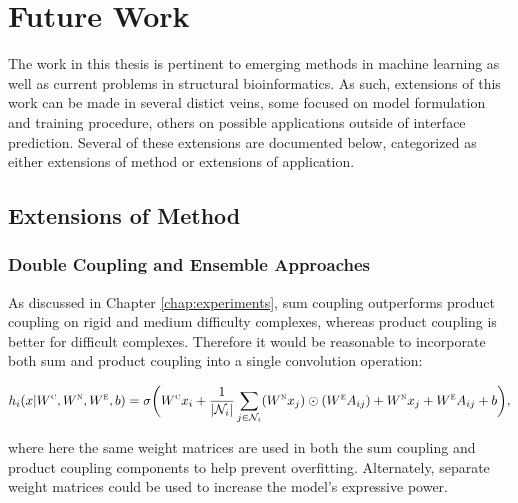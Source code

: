 \chapter{Future Work}
\label{chap:future}

The work in this thesis is pertinent to emerging methods in machine learning as well as current problems in structural bioinformatics.
As such, extensions of this work can be made in several distict veins, some focused on model formulation and training procedure, others on possible applications outside of interface prediction.
Several of these extensions are documented below, categorized as either extensions of method or extensions of application.

\section{Extensions of Method}

\subsection{Double Coupling and Ensemble Approaches}

As discussed in Chapter \ref{chap:experiments}, sum coupling outperforms product coupling on rigid and medium difficulty complexes, whereas product coupling is better for difficult complexes.
Therefore it would be reasonable to incorporate both sum and product coupling into a single convolution operation:

\begin{equation}
h_i(x | W^\textsc{c}, W^\textsc{n}, W^\textsc{e}, b) = \sigma \bigg( W^{\textsc{c}} x_i + \frac{1}{|\mathcal{N}_i|}\sum_{j \in \mathcal{N}_i} (W^{\textsc{n}} x_j) \odot (W^{\textsc{e}} A_{ij}) + W^{\textsc{n}} x_j + W^{\textsc{e}} A_{ij} + b \bigg),
\label{eq:double_coupling}
\end{equation}

\noindent
where here the same weight matrices are used in both the sum coupling and product coupling components to help prevent overfitting. 
Alternately, separate weight matrices could be used to increase the model's expressive power.

